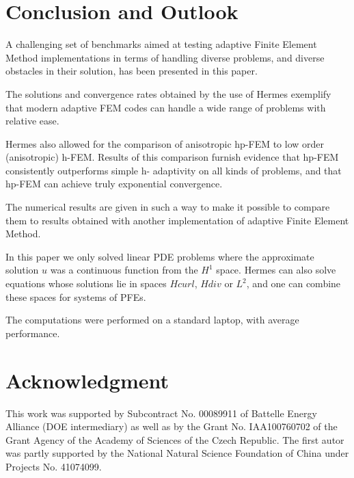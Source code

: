 \section{Conclusion and Outlook}
\label{sec:conclusion}

A challenging set of benchmarks aimed at testing adaptive Finite Element Method implementations in terms of handling diverse problems, and diverse obstacles in their solution, has been presented in this paper. 

The solutions and convergence rates obtained by the use of Hermes exemplify that modern adaptive FEM codes can handle a wide range of problems with relative ease. 

Hermes also allowed for the comparison of anisotropic hp-FEM to low order (anisotropic) h-FEM. Results of this comparison furnish evidence that hp-FEM consistently outperforms simple h- adaptivity on all kinds of problems, and that hp-FEM can achieve truly exponential convergence.

The numerical results are given in such a way to make it possible to compare them to results obtained with another implementation of adaptive Finite Element Method. 

In this paper we only solved linear PDE problems where the approximate solution $u$ was a continuous function from the $H^1$ space.
Hermes can also solve equations whose solutions lie in spaces
$Hcurl$, $Hdiv$ or $L^2$, and one can combine these spaces for systems of PFEs.

The computations were performed on a standard laptop, with average performance.

\section{Acknowledgment}

This work was supported by Subcontract No. 00089911 of Battelle
Energy Alliance (DOE intermediary) as well as by the
Grant No. IAA100760702 of the Grant Agency of the Academy
of Sciences of the Czech Republic. The first autor was partly
supported by the National Natural Science Foundation
of China under Projects No. 41074099.
